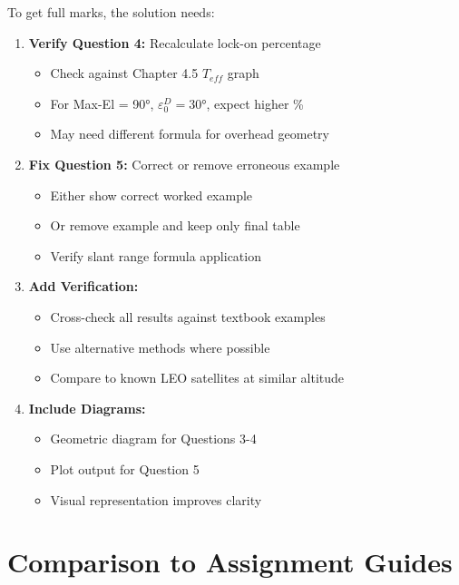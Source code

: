 \documentclass[11pt,letterpaper]{article}
\begin{document}
To get full marks, the solution needs:
\begin{enumerate}
    \item \textbf{Verify Question 4:} Recalculate lock-on percentage
    \begin{itemize}
        \item Check against Chapter 4.5 $T_{eff}$ graph
        \item For Max-El = 90°, $\varepsilon_0^D = 30°$, expect higher \%
        \item May need different formula for overhead geometry
    \end{itemize}

    \item \textbf{Fix Question 5:} Correct or remove erroneous example
    \begin{itemize}
        \item Either show correct worked example
        \item Or remove example and keep only final table
        \item Verify slant range formula application
    \end{itemize}

    \item \textbf{Add Verification:}
    \begin{itemize}
        \item Cross-check all results against textbook examples
        \item Use alternative methods where possible
        \item Compare to known LEO satellites at similar altitude
    \end{itemize}

    \item \textbf{Include Diagrams:}
    \begin{itemize}
        \item Geometric diagram for Questions 3-4
        \item Plot output for Question 5
        \item Visual representation improves clarity
    \end{itemize}
\end{enumerate}

\section{Comparison to Assignment Guides}
\end{document}
